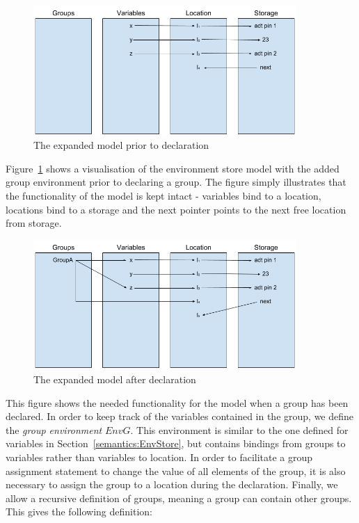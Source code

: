 \begin{figure}[H]
\centering
  \includegraphics[width=10cm]{figures/semantics/2.png}
  \caption{The expanded model prior to declaration}
  \label{fig:emptyGroup}
\end{figure}
\noindent
Figure~\ref{fig:emptyGroup} shows a visualisation of the environment store model with the added group environment prior to declaring a group. The figure simply illustrates that the functionality of the model is kept intact - variables bind to a location, locations bind to a storage and the next pointer points to the next free location from storage.
\begin{figure}[H]
\centering
  \includegraphics[width=10cm]{figures/semantics/3.png}
  \caption{The expanded model after declaration}
  \label{fig:groupA}
\end{figure}
\noindent
This figure shows the needed functionality for the model when a group has been declared. In order to keep track of the variables contained in the group, we define the \textit{group environment} $EnvG$. This environment is similar to the one defined for variables in Section~\ref{semantics:EnvStore}, but contains bindings from groups to variables rather than variables to location. In order to facilitate a group assignment statement to change the value of all elements of the group, it is also necessary to assign the group to a location during the declaration. Finally, we allow a recursive definition of groups, meaning a group can contain other groups. This gives the following definition:
\\
